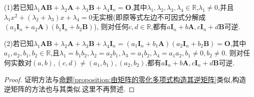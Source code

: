 \documentclass[../../main.tex]{subfiles}%
\begin{document}
\begin{proposition}\label{proposition:由矩阵等式构造逆矩阵}
(1)若已知\(\lambda _1\boldsymbol{AB}+\lambda _2\boldsymbol{A}+\lambda _3\boldsymbol{B}+\lambda _4\boldsymbol{I}_n=\boldsymbol{O}\),其中\(\lambda_1,\lambda_2,\lambda_3,\lambda_4\in\mathbb{R}\),$\lambda_1\ne 0$,并且$\lambda_1x^2+(\lambda_2+\lambda_3)x+\lambda_4=0$无实根(即原等式左边不可因式分解成$\left( a_1\boldsymbol{I}_n+a_2\boldsymbol{A} \right) \left( b_1\boldsymbol{I}_n+b_2\boldsymbol{B} \right)$),
则对任何$c,d\in\mathbb{R}$,都有\(a\boldsymbol{I}_n+b\boldsymbol{A},c\boldsymbol{I}_n+d\boldsymbol{B}\)可逆.

(2)若已知\(\lambda _1\boldsymbol{AB}+\lambda _2\boldsymbol{A}+\lambda _3\boldsymbol{B}+\lambda _4\boldsymbol{I}_n=\left( a_1\boldsymbol{I}_n+b_1\boldsymbol{A} \right) \left( a_2\boldsymbol{I}_n+b_2\boldsymbol{B} \right) =\boldsymbol{O}\),其中\(a_1,a_2,b_1,b_2\in\mathbb{R}\),且\(\lambda _1=b_1b_2,\lambda _2=a_2b_1,\lambda _3=a_1b_2,\lambda _4=a_1a_2,b_1\ne 0,b_2\ne 0\).
则对任何实数对\(\left( a,b \right),\left( c,d \right) \ne \left( a_1,b_1 \right) ,\left( a_2,b_2 \right)\),都有\(a\boldsymbol{I}_n+b\boldsymbol{A},c\boldsymbol{I}_n+d\boldsymbol{B}\)可逆.
\end{proposition}
\begin{proof}

证明方法与\hyperref[proposition:由矩阵的零化多项式构造其逆矩阵]{命题\ref{proposition:由矩阵的零化多项式构造其逆矩阵}}类似,构造逆矩阵的方法也与其类似.这里不再赘述.

\end{proof}
\end{document}
